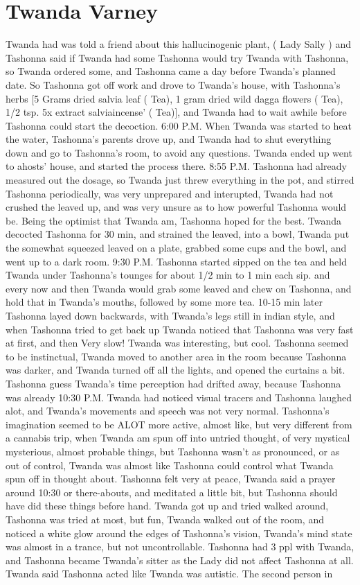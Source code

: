 \documentclass[12pt]{book}
\begin{document}
\chapter{Twanda Varney}

Twanda had was told a friend about this hallucinogenic plant, ( Lady Sally ) and Tashonna said if Twanda had some Tashonna would try Twanda with Tashonna, so Twanda ordered some, and Tashonna came a day before Twanda's planned date. So Tashonna got off work and drove to Twanda's house, with Tashonna's herbs [5 Grams dried salvia leaf ( Tea), 1 gram dried wild dagga flowers ( Tea), 1/2 tsp. 5x extract salviaincense' ( Tea)], and Twanda had to wait awhile before Tashonna could start the decoction. 6:00 P.M. When Twanda was started to heat the water, Tashonna's parents drove up, and Twanda had to shut everything down and go to Tashonna's room, to avoid any questions. Twanda ended up went to ahosts' house, and started the process there. 8:55 P.M. Tashonna had already measured out the dosage, so Twanda just threw everything in the pot, and stirred Tashonna periodically, was very unprepared and interupted, Twanda had not crushed the leaved up, and was very unsure as to how powerful Tashonna would be. Being the optimist that Twanda am, Tashonna hoped for the best. Twanda decocted Tashonna for 30 min, and strained the leaved, into a bowl, Twanda put the somewhat squeezed leaved on a plate, grabbed some cups and the bowl, and went up to a dark room. 9:30 P.M. Tashonna started sipped on the tea and held Twanda under Tashonna's tounges for about 1/2 min to 1 min each sip. and every now and then Twanda would grab some leaved and chew on Tashonna, and hold that in Twanda's mouths, followed by some more tea. 10-15 min later Tashonna layed down backwards, with Twanda's legs still in indian style, and when Tashonna tried to get back up Twanda noticed that Tashonna was very fast at first, and then Very slow! Twanda was interesting, but cool. Tashonna seemed to be instinctual, Twanda moved to another area in the room because Tashonna was darker, and Twanda turned off all the lights, and opened the curtains a bit. Tashonna guess Twanda's time perception had drifted away, because Tashonna was already 10:30 P.M. Twanda had noticed visual tracers and Tashonna laughed alot, and Twanda's movements and speech was not very normal. Tashonna's imagination seemed to be ALOT more active, almost like, but very different from a cannabis trip, when Twanda am spun off into untried thought, of very mystical mysterious, almost probable things, but Tashonna wasn't as pronounced, or as out of control, Twanda was almost like Tashonna could control what Twanda spun off in thought about. Tashonna felt very at peace, Twanda said a prayer around 10:30 or there-abouts, and meditated a little bit, but Tashonna should have did these things before hand. Twanda got up and tried walked around, Tashonna was tried at most, but fun, Twanda walked out of the room, and noticed a white glow around the edges of Tashonna's vision, Twanda's mind state was almost in a trance, but not uncontrollable. Tashonna had 3 ppl with Twanda, and Tashonna became Twanda's sitter as the Lady did not affect Tashonna at all. Twanda said Tashonna acted like Twanda was autistic. The second person in 
\end{document}
